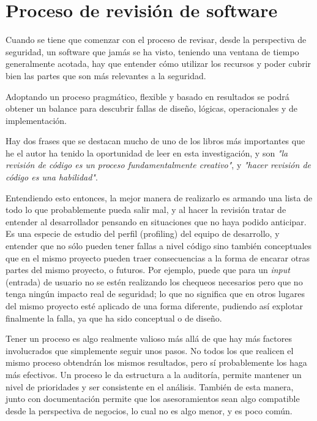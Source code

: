 \section{Proceso de revisión de software}
Cuando se tiene que comenzar con el proceso de revisar, desde la perspectiva de seguridad, un software que jamás se ha visto, teniendo una ventana de tiempo generalmente acotada, hay que entender cómo utilizar los recursos y poder cubrir bien las partes que son más relevantes a la seguridad.

Adoptando un proceso pragmático, flexible y basado en resultados se podrá obtener un balance para descubrir fallas de diseño, lógicas, operacionales y de implementación.

Hay dos frases que se destacan mucho de uno de los libros más importantes que he el autor ha tenido la oportunidad de leer en esta investigación, y son \textit{"la revisión de código es un proceso fundamentalmente creativo"}, y \textit{"hacer revisión de código es una habilidad"}. 

Entendiendo esto entonces, la mejor manera de realizarlo es armando una lista de todo lo que probablemente pueda salir mal, y al hacer la revisión tratar de entender al desarrollador pensando en situaciones que no haya podido anticipar. Es una especie de estudio del perfil (profiling) del equipo de desarrollo, y entender que no sólo pueden tener fallas a nivel código sino también conceptuales que en el mismo proyecto pueden traer consecuencias a la forma de encarar otras partes del mismo proyecto, o futuros. Por ejemplo, puede que para un \textit{input} (entrada) de usuario no se estén realizando los chequeos necesarios pero que no tenga ningún impacto real de seguridad; lo que no significa que en otros lugares del mismo proyecto esté aplicado de una forma diferente, pudiendo así explotar finalmente la falla, ya que ha sido conceptual o de diseño.

Tener un proceso es algo realmente valioso más allá de que hay más factores involucrados que simplemente seguir unos pasos. No todos los que realicen el mismo proceso obtendrán los mismos resultados, pero sí probablemente los haga más efectivos. Un proceso le da estructura a la auditoría, permite mantener un nivel de prioridades y ser consistente en el análisis. También de esta manera, junto con documentación permite que los asesoramientos sean algo compatible desde la perspectiva de negocios, lo cual no es algo menor, y es poco común.

